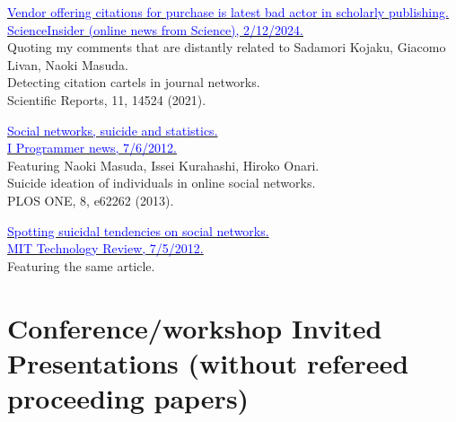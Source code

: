 \documentclass[11pt,letter]{article}
\begin{document}
\begin{etaremune}

\item \href{https://www.science.org/content/article/vendor-offering-citations-purchase-latest-bad-actor-scholarly-publishing}{\textcolor{blue}{Vendor offering citations for purchase is latest bad actor in scholarly publishing.\\
ScienceInsider (online news from Science), 2/12/2024.}}\\
Quoting my comments that are distantly related to Sadamori Kojaku, Giacomo Livan, Naoki Masuda.\\
Detecting citation cartels in journal networks.\\
Scientific Reports, 11, 14524 (2021).
%


\item \href{https://www.i-programmer.info/news/197-data-mining/4460-social-networks-suicide-and-statistics.html}{\textcolor{blue}{Social networks, suicide and statistics.\\
I Programmer news, 7/6/2012.}}\\
Featuring Naoki Masuda, Issei Kurahashi, Hiroko Onari.\\
Suicide ideation of individuals in online social networks.\\
PLOS ONE, 8, e62262 (2013).

\item \href{https://www.technologyreview.com/2012/07/05/19105/spotting-suicidal-tendencies-on-social-networks/}{\textcolor{blue}{Spotting suicidal tendencies on social networks.\\
MIT Technology Review, 7/5/2012.}}\\
Featuring the same article.

\end{etaremune}

\section*{\bf \normalsize Conference/workshop Invited Presentations (without refereed proceeding papers)}
\end{document}
